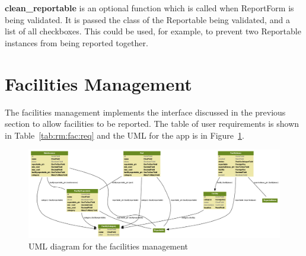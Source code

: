 \textbf{clean\_reportable} is an optional function which is called when ReportForm is being validated. It is passed the class of the Reportable being validated, and a list of all checkboxes. This could be used, for example, to prevent two Reportable instances from being reported together.

\section{Facilities Management}
The facilities management implements the interface discussed in the previous section to allow facilities to be reported. The table of user requirements is shown in Table~\ref{tab:rm:fac:req} and the UML for the app is in Figure~\ref{fig:rm:fac:uml}.

\begin{figure}[thp]
\centering
\includegraphics[scale=0.35,angle=90]{img/facilities.png}
\caption{UML diagram for the facilities management}
\label{fig:rm:fac:uml}
\end{figure}

